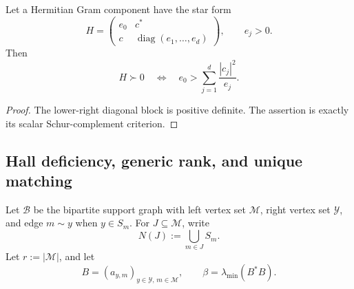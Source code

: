 \begin{proposition}
\label{prop:tpc66-star-schur}
Let a Hermitian Gram component have the star form
\[
 H=
 \begin{pmatrix}
 e_0&c^*\\
 c&\operatorname{diag}(e_1,\ldots,e_d)
 \end{pmatrix},
 \qquad e_j>0.
\]
Then
\begin{equation}
 \boxed{
 H\succ0
 \quad\Longleftrightarrow\quad
 e_0>\sum_{j=1}^d\frac{|c_j|^2}{e_j}.}
 \label{eq:tpc66-star-schur-condition}
\end{equation}
\end{proposition}

\begin{proof}
The lower-right diagonal block is positive definite.  The assertion is
exactly its scalar Schur-complement criterion.
\end{proof}

\subsection{Hall deficiency, generic rank, and unique matching}

Let \(\mathcal B\) be the bipartite support graph with left vertex set
\(\mathcal M\), right vertex set \(\mathcal Y\), and edge \(m\sim y\)
when \(y\in S_m\).  For \(J\subseteq\mathcal M\), write
\[
 N(J):=\bigcup_{m\in J}S_m.
\]
Let \(r:=|\mathcal M|\), and let
\[
 B=(a_{y,m})_{y\in\mathcal Y,\,m\in\mathcal M},
 \qquad
 \beta=\lambda_{\min}(B^*B).
\]


